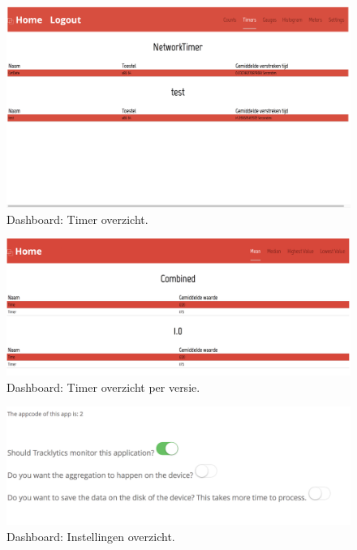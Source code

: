 \begin{figure}[!h]
  \centering
  \includegraphics[scale=0.2]{Afbeeldingen/Implementatie/Timer}
  \caption{Dashboard: Timer overzicht.}
  \label{fig:DasbhoardTimer}
\end{figure}

\begin{figure}[!h]
  \centering
  \includegraphics[scale=0.2]{Afbeeldingen/Implementatie/Timer-Combined}
  \caption{Dashboard: Timer overzicht per versie.}
  \label{fig:DasbhoardTimerCombined}
\end{figure}

\begin{figure}[!h]
  \centering
  \includegraphics[scale=0.2]{Afbeeldingen/Implementatie/Settings}
  \caption{Dashboard: Instellingen overzicht.}
  \label{fig:DasbhoardSettings}
\end{figure}








